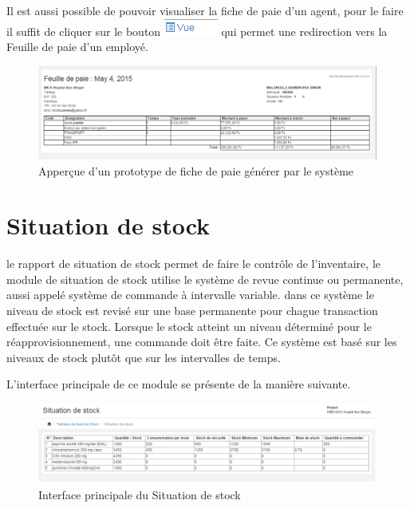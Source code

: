 \documentclass[12pt,a4paper]{report}
\begin{document}
Il est aussi possible de pouvoir visualiser la fiche de paie d'un agent, pour le faire il suffit de cliquer sur le bouton \includegraphics[scale=0.7]{pic/VuePaieSlip.png} qui permet une redirection vers la Feuille de paie d'un employé.

\begin{figure}[h]
\begin{center}
\includegraphics[width=14cm]{pic/FeuillePaie.png}
\end{center}
\caption{Apperçue d'un prototype de fiche de paie générer par le système}
\label{Apperçue d'un prototype de fiche de paie générer par le système}
\end{figure}
\newpage



\newpage

\section{Situation de stock}
le rapport de situation de stock permet de faire le contrôle de l'inventaire, le module de situation de stock utilise le système de revue continue ou permanente, aussi appelé système de commande à intervalle variable. dans ce système le niveau de stock est revisé sur une base permanente pour chague transaction effectuée sur le stock. Lorsque le stock atteint un niveau déterminé pour le réapprovisionnement, une commande doit être faite. Ce système est basé sur les niveaux de stock plutôt que sur les intervalles de temps.

L'interface principale de ce module se présente de la manière suivante.

\begin{figure}[h]
\begin{center}
\includegraphics[width=14cm]{pic/SituationStock.png}
\end{center}
\caption{Interface principale du Situation de stock}
\label{Interface principale du Situation de stock}
\end{figure}
\end{document}
